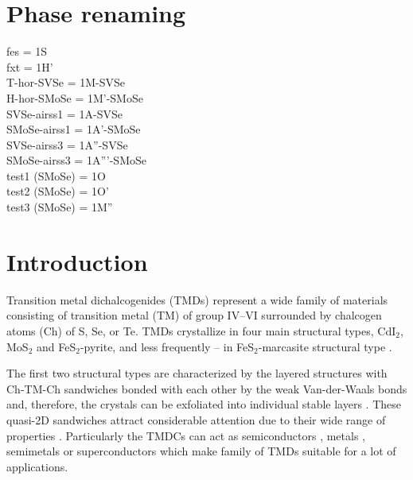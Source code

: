 \documentclass[a4paperm]{article}
\begin{document}
\section*{Phase renaming}
fes = 1S \\
fxt = 1H' \\
T-hor-SVSe = 1M-SVSe \\
H-hor-SMoSe = 1M'-SMoSe \\
SVSe-airss1 = 1A-SVSe \\
SMoSe-airss1 = 1A'-SMoSe \\
SVSe-airss3 = 1A''-SVSe \\
SMoSe-airss3 = 1A'''-SMoSe \\
test1 (SMoSe) = 1O \\
test2 (SMoSe) = 1O' \\
test3 (SMoSe) = 1M'' \\


\section{Introduction}

Transition metal dichalcogenides (TMDs) represent a wide family of materials consisting of transition metal (TM) of group IV--VI surrounded by chalcogen atoms (Ch) of S, Se, or Te. 
TMDs crystallize in four main structural types, CdI$_2$, MoS$_2$ and FeS$_2$-pyrite, and less frequently -- in FeS$_2$-marcasite structural type \cite{wells}.

The first two structural types are characterized by the layered structures with Ch-TM-Ch sandwiches bonded with each other by the weak Van-der-Waals bonds and, therefore, the crystals can be exfoliated into individual stable layers \cite{zhang2020intercalation}. These quasi-2D sandwiches attract considerable attention due to their wide range of properties \cite{li2017graphene, SHI20181, xi2016ising, hu2019recent, pi2019recent}. 
Particularly the TMDCs can act as semiconductors \cite{nayeri2018transport}, metals \cite{zhao20212d}, semimetals \cite{xu2020high, zhao2020observation} or superconductors \cite{wang2020nodeless,hsu2017topological} which make family of TMDs suitable for a lot of applications. 
\end{document}
